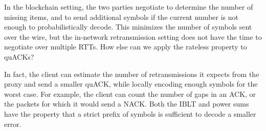 In the blockchain setting, the two parties negotiate to determine the number of
missing items, and to send additional symbols if the current number is not
enough to probabilistically decode. This minimizes the number of symbols sent
over the wire, but the in-network retransmission setting does not have the time
to negotiate over multiple RTTs. How else can we apply the rateless property to
quACKs?

In fact, the client can estimate the number of retransmissions it expects from
the proxy and send a smaller quACK, while locally encoding enough symbols for
the worst case. For example, the client can count the number of gaps in an ACK,
or the packets for which it would send a NACK. Both the IBLT and power sums
have the property that a strict prefix of symbols is sufficient to decode a
smaller error.
